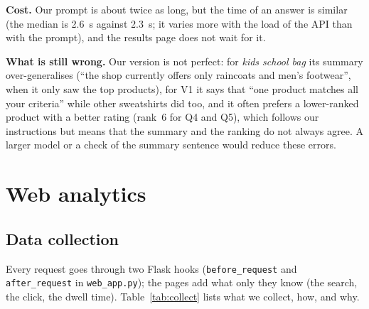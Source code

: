 \documentclass[11pt,a4paper]{article}
\newcommand{\code}[1]{\texttt{#1}}
\begin{document}
\textbf{Cost.} Our prompt is about twice as long, but the time of an answer is similar (the median is 2.6~s against
2.3~s; it varies more with the load of the API than with the prompt), and the results page does not wait for it.

\textbf{What is still wrong.} Our version is not perfect: for \emph{kids school bag} its summary over-generalises (``the
shop currently offers only raincoats and men's footwear'', when it only saw the top products), for V1 it says that
``one product matches all your criteria'' while other sweatshirts did too, and it often prefers a lower-ranked product with
a better rating (rank~6 for Q4 and Q5), which follows our instructions but means that the summary and the ranking do not
always agree. A larger model or a check of the summary sentence would reduce these errors.


\section{Web analytics}
\label{sec:analytics}

\subsection{Data collection}
Every request goes through two Flask hooks (\code{before\_request} and \code{after\_request} in \code{web\_app.py});
the pages add what only they know (the search, the click, the dwell time). Table~\ref{tab:collect} lists what we
collect, how, and why.
\end{document}
